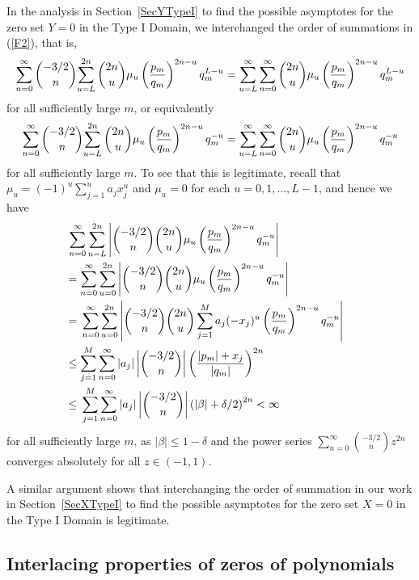 \documentclass{article}
\theoremstyle{remark}
\numberwithin{equation}{section}
\begin{document}
In the analysis in Section~\ref{SecYTypeI} to find the possible asymptotes for the zero set $Y=0$ in the Type I Domain, we interchanged the order of summations in
(\ref{F2}), that is,
\begin{equation} \notag 
\sum_{n=0}^\infty{\binom{-3/2}{n}{\sum_{u=L}^{2n}{\binom{2n}{u} \mu_u \left( \frac{p_m}{q_m} \right)^{2n-u} q_m^{L-u}}}}  
= \sum_{u=L}^\infty{\sum_{n=0}^\infty{\binom{2n}{u} \mu_u \left( \frac{p_m}{q_m} \right)^{2n-u} q_m^{L-u}}} 
\end{equation}
for all sufficiently large $m$, or equivalently
\begin{equation} \notag 
\sum_{n=0}^\infty{\binom{-3/2}{n}{\sum_{u=L}^{2n}{\binom{2n}{u} \mu_u \left( \frac{p_m}{q_m} \right)^{2n-u} q_m^{-u}}}}  
= \sum_{u=L}^\infty{\sum_{n=0}^\infty{\binom{2n}{u} \mu_u \left( \frac{p_m}{q_m} \right)^{2n-u} q_m^{-u}}} 
\end{equation}
for all sufficiently large $m$. To see that this is legitimate, recall that $\mu_u = (-1)^u\sum_{j=1}^u{a_jx_j^u}$ and 
$\mu_u = 0$ for each $u=0,1,\ldots,L-1$, and hence we have
\begin{equation} \notag 
\begin{split}
&\, \sum_{n=0}^\infty{ \sum_{u=L}^{2n}{\left| \binom {-3/2}{n} \binom{2n}{u} \mu_u \left( \frac{p_m}{q_m} \right)^{2n-u} q_m^{-u} \right|}}  \cr
&= \sum_{n=0}^\infty{ \sum_{u=0}^{2n}{\left| \binom {-3/2}{n} \binom{2n}{u} \mu_u \left( \frac{p_m}{q_m} \right)^{2n-u} q_m^{-u} \right|}} \cr
&= \,  \sum_{n=0}^\infty{\sum_{u=0}^{2n}{\left| \binom {-3/2}{n} \binom{2n}{u} \sum_{j=1}^M{a_j(-x_j)^u} \left( \frac{p_m}{q_m} \right)^{2n-u} q_m^{-u} \right|}}\cr
&\leq \sum_{j=1}^M{\sum_{n=0}^\infty{|a_j| \left| \binom {-3/2}{n} \right| \left( \frac{|p_m| + x_j}{|q_m|} \right)^{2n}}} \cr
&\leq \,  \sum_{j=1}^M{\sum_{n=0}^\infty{|a_j| \left| \binom {-3/2}{n} \right| \left( |\beta| + \delta/2 \right)^{2n}}} < \infty \cr
\end{split}
\end{equation}
for all sufficiently large $m$, as $|\beta| \leq 1-\delta$ and the power series $\sum_{n=0}^\infty{\binom {-3/2}{n} z^{2n}}$ converges absolutely 
for all $z \in (-1,1)$. 

A similar argument shows that interchanging the order of summation in our work in Section~\ref{SecXTypeI} to find the possible asymptotes for the zero set $X=0$ in 
the Type I Domain is legitimate.

\subsection{Interlacing properties of zeros of polynomials}\label{lace}
\end{document}
